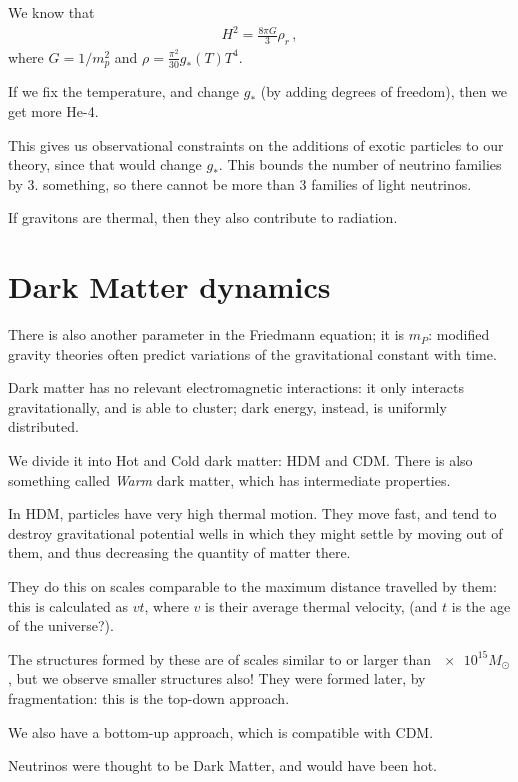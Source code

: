 \documentclass[main.tex]{subfiles}
\begin{document}
We know that 
%
\begin{align}
  H^2 = \frac{8 \pi G}{3} \rho_r
\,,
\end{align}
%
where \(G = 1 / m_p^2\) and \(\rho = \frac{\pi^2}{30} g_{*}(T) T^4\).

If we fix the temperature, and change \(g_{*}\) (by adding degrees of freedom), then we get more He-4. 

This gives us observational constraints on the additions of exotic particles to our theory, since that would change \(g_{*}\). 
This bounds the number of neutrino families by \num{3.} something, so there cannot be more than \num{3} families of light neutrinos. 

If gravitons are thermal, then they also contribute to radiation. 

\section{Dark Matter dynamics}

There is also another parameter in the Friedmann equation; it is \(m_P\): modified gravity theories often predict variations of the gravitational constant with time. 

Dark matter has no relevant electromagnetic interactions: it only interacts gravitationally, and is able to cluster; dark energy, instead, is uniformly distributed. 

We divide it into Hot and Cold dark matter: HDM and CDM. 
There is also something called \emph{Warm} dark matter, which has intermediate properties.

In HDM, particles have very high thermal motion. They move fast, and tend to destroy gravitational potential wells in which they might settle by moving out of them, and thus decreasing the quantity of matter there. 

They do this on scales comparable to the maximum distance travelled by them: this is calculated as \(vt\), where \(v\) is their average thermal velocity, (and \(t\) is the age of the universe?). 

The structures formed by these are of scales similar  to or larger than \(\num{e15} M_{\odot}\), but we observe smaller structures also! They were formed later, by fragmentation: this is the top-down approach. 

We also have a bottom-up approach, which is compatible with CDM. 

Neutrinos were thought to be Dark Matter, and would have been hot. 
\end{document}
